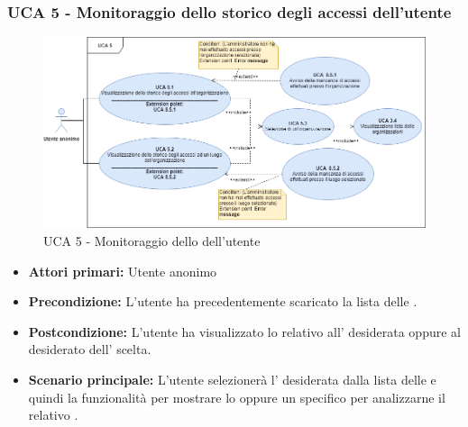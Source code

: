 \subsubsection{UCA 5 - Monitoraggio dello storico degli accessi dell'utente}

\begin{figure}[h]
	\centering	
	\includegraphics[scale=0.4, center]{Sezioni/UseCase/Immagini/UCA5.png}
	\caption{UCA 5 - Monitoraggio dello  dell'utente}
\end{figure}

\begin{itemize}
    \item \textbf{Attori primari:} Utente anonimo
    \item \textbf{Precondizione:} L'utente ha precedentemente scaricato la lista delle .
    \item \textbf{Postcondizione:} L'utente ha visualizzato lo  relativo all' desiderata oppure al  desiderato dell' scelta.
    \item \textbf{Scenario principale:} L'utente selezionerà l' desiderata dalla lista delle  e quindi la funzionalità per mostrare lo  oppure un  specifico per analizzarne il relativo .
\end{itemize}

